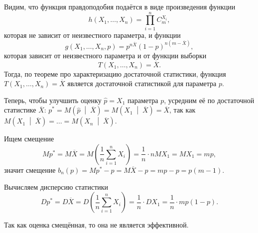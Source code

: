 Видим, что функция правдоподобия подаётся в виде произведения функции
$$h \left( X_1, \dotsc, X_n \right) =
  \prod \limits_{i = 1}^n C_m^{X_i},$$
которая не зависит от неизвестного параметра,
и функции
$$g \left( X_1, \dotsc, X_n, p \right) =
  p^{n \overline{X}} \left( 1 - p \right)^{n \left( m - \overline{X} \right) },$$
которая зависит от неизвестного параметра и от функции выборки
$$T \left( X_1, \dotsc, X_n \right) =
  \overline{X}.$$
Тогда, по теореме про характеризацию достаточной статистики,
функция $T \left( X_1, \dotsc, X_n \right) = \overline{X}$
является достаточной статистикой для параметра $p$.

Теперь, чтобы улучшить оценку $ \hat{p} = X_1$ параметра $p$,
усредним её по достаточной статистике
$ \overline{X}: \,
  p^* =
  M \left( \hat{p} \; \middle| \; \overline{X} \right) =
  M \left( X_1 \; \middle| \; \overline{X} \right) =
  \overline{X}$,
так как
$M \left( X_1 \; \middle| \; \overline{X} \right) =
  \dotsc =
  M \left( X_n \; \middle| \; \overline{X} \right) $.

Ищем смещение
$$Mp^* =
  M \overline{X} =
  M \left( \frac{1}{n} \sum \limits_{i = 1}^n X_i \right) =
  \frac{1}{n} \cdot nMX_1 =
  MX_1 =
  mp,$$
значит смещение
$b_n \left( p \right) =
  Mp^* - p =
  M \overline{X} - p =
  mp - p =
  p \left( m - 1 \right) $.

Вычисляем дисперсию статистики
$$Dp^* =
  D \overline{X} =
  D \left( \frac{1}{n} \sum \limits_{i = 1}^n X_i \right) =
  \frac{1}{n} \cdot DX_1 =
  \frac{1}{n} \cdot mp \left( 1 - p \right).$$

Так как оценка смещённая, то она не является эффективной.
